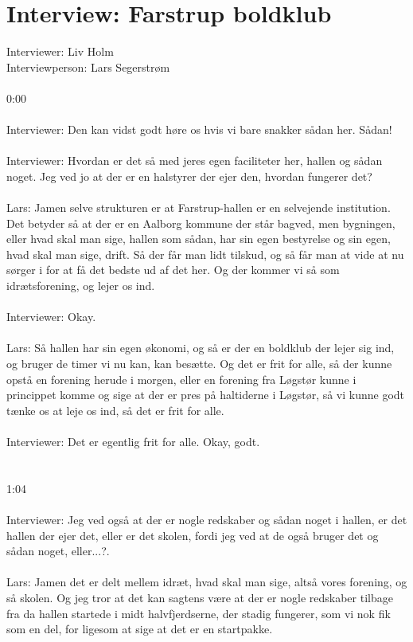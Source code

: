 \chapter{Interview: Farstrup boldklub}\label{ch:appBlabel}
Interviewer: Liv Holm\\
Interviewperson: Lars Segerstrøm
\\\\
0:00
\\\\
Interviewer: Den kan vidst godt høre os hvis vi bare snakker sådan her. Sådan!
\\\\
Interviewer: Hvordan er det så med jeres egen faciliteter her, hallen og sådan noget. Jeg ved jo at der er en halstyrer der ejer den, hvordan fungerer det?
\\\\
Lars: Jamen selve strukturen er at Farstrup-hallen er en selvejende institution. Det betyder så at der er en Aalborg kommune der står bagved, men bygningen, eller hvad skal man sige, hallen som sådan, har sin egen bestyrelse og sin egen, hvad skal man sige, drift. Så der får man lidt tilskud, og så får man at vide at nu sørger i for at få det bedste ud af det her. Og der kommer vi så som idrætsforening, og lejer os ind.
\\\\
Interviewer: Okay.
\\\\
Lars: Så hallen har sin egen økonomi, og så er der en boldklub der lejer sig ind, og bruger de timer vi nu kan, kan besætte. Og det er frit for alle, så der kunne opstå en forening herude i morgen, eller en forening fra Løgstør kunne i princippet komme og sige at der er pres på haltiderne i Løgstør, så vi kunne godt tænke os at leje os ind, så det er frit for alle.
\\\\
Interviewer: Det er egentlig frit for alle. Okay, godt.
\\\\\\
1:04
\\\\
Interviewer: Jeg ved også at der er nogle redskaber og sådan noget i hallen, er det hallen der ejer det, eller er det skolen, fordi jeg ved at de også bruger det og sådan noget, eller...?.
\\\\
Lars: Jamen det er delt mellem idræt, hvad skal man sige, altså vores forening, og så skolen. Og jeg tror at det kan sagtens være at der er nogle redskaber tilbage fra da hallen startede i midt halvfjerdserne, der stadig fungerer, som vi nok fik som en del, for ligesom at sige at det er en startpakke.
